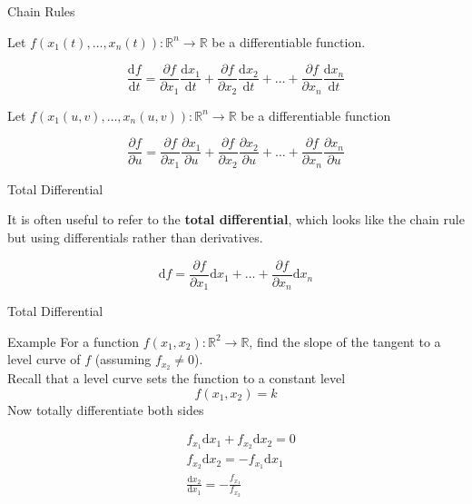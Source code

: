 \documentclass[11pt, xcolor={dvipsnames}, hyperref={colorlinks, allcolors=Blue}]{beamer}
\newcommand\bc[1]{{\usebeamercolor[fg]{frametitle} {\textbf{#1}}}} %
\newcommand{\into}{\rightarrow}
\newcommand{\R}{\mathbb{R}}
\begin{document}
\begin{frame}{Chain Rules}

\begin{theorem}
Let $f\left(x_{1}(t),\dots,x_{n}(t)\right):\R^{n}\into\R$ be a differentiable function.

\[\frac{\mathrm{d}f}{\mathrm{d}t} = \frac{\partial f}{\partial x_{1}} \frac{\mathrm{d}x_{1}}{\mathrm{d} t} + \frac{\partial f}{\partial x_{2}}\frac{\mathrm{d}x_{2}}{\mathrm{d}t} + \dots + \frac{\partial f}{\partial x_{n}}\frac{\mathrm{d}x_{n}}{\mathrm{d}t}\]
\end{theorem}
\bigskip

\begin{theorem}
Let $f\left(x_{1}(u,v),\dots, x_{n}(u,v)\right):\R^{n}\into\R$ be a differentiable function

\[ \frac{\partial f}{\partial u} = \frac{\partial f}{\partial x_{1}}\frac{\partial x_{1}}{\partial u} + \frac{\partial f}{\partial x_{2}}\frac{\partial x_{2}}{\partial u} + \dots + \frac{\partial f}{\partial x_{n}}\frac{\partial x_{n}}{\partial u}\]
\end{theorem}

\end{frame}

\begin{frame}{Total Differential}

It is often useful to refer to the \bc{total differential}, which looks like the chain rule but using differentials rather than derivatives.

\[\mathrm{d}f = \frac{\partial f}{\partial x_{1}} \mathrm{d}x_{1} + \dots + \frac{\partial f}{\partial x_{n}} \mathrm{d}x_{n} \]

\end{frame}

\begin{frame}{Total Differential}

\begin{block}{Example}
For a function $f(x_{1}, x_{2}):\R^{2}\into\R$, find the slope of the tangent to a level curve of $f$ (assuming $f_{x_{2}} \not = 0$).\\

Recall that a level curve sets the function to a constant level
\[f(x_{1},x_{2}) = k\]
Now totally differentiate both sides

\begin{align*}
&f_{x_{1}} \mathrm{d}x_{1} + f_{x_{2}} \mathrm{d}x_{2} = 0\\
&f_{x_{2}} \mathrm{d}x_{2} = -f_{x_{1}} \mathrm{d}x_{1}\\
& \frac{\mathrm{d}x_{2}}{\mathrm{d}x_{1}} = - \frac{f_{x_{1}}}{f_{x_{2}}}
\end{align*}

\end{block}
\end{frame}
\end{document}
